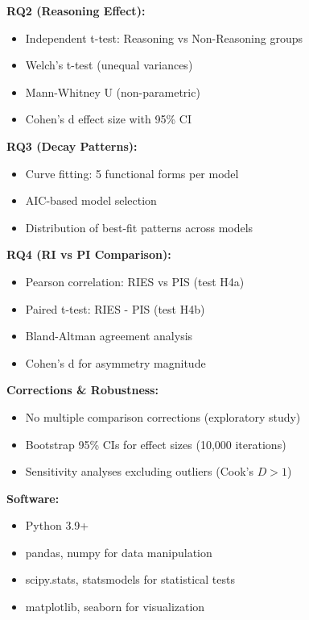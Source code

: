 \documentclass{article}
\begin{document}
\textbf{RQ2 (Reasoning Effect):}
\begin{itemize}[itemsep=2pt,topsep=3pt,parsep=0pt]
    \item Independent t-test: Reasoning vs Non-Reasoning groups
    \item Welch's t-test (unequal variances)
    \item Mann-Whitney U (non-parametric)
    \item Cohen's d effect size with 95\% CI
\end{itemize}

\textbf{RQ3 (Decay Patterns):}
\begin{itemize}[itemsep=2pt,topsep=3pt,parsep=0pt]
    \item Curve fitting: 5 functional forms per model
    \item AIC-based model selection
    \item Distribution of best-fit patterns across models
\end{itemize}

\textbf{RQ4 (RI vs PI Comparison):}
\begin{itemize}[itemsep=2pt,topsep=3pt,parsep=0pt]
    \item Pearson correlation: RIES vs PIS (test H4a)
    \item Paired t-test: RIES - PIS (test H4b)
    \item Bland-Altman agreement analysis
    \item Cohen's d for asymmetry magnitude
\end{itemize}

\textbf{Corrections \& Robustness:}
\begin{itemize}[itemsep=2pt,topsep=3pt,parsep=0pt]
    \item No multiple comparison corrections (exploratory study)
    \item Bootstrap 95\% CIs for effect sizes (10,000 iterations)
    \item Sensitivity analyses excluding outliers (Cook's $D > 1$)
\end{itemize}

\textbf{Software:}
\begin{itemize}[itemsep=2pt,topsep=3pt,parsep=0pt]
    \item Python 3.9+
    \item pandas, numpy for data manipulation
    \item scipy.stats, statsmodels for statistical tests
    \item matplotlib, seaborn for visualization
\end{itemize}
\end{document}
